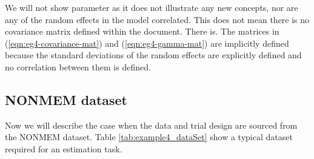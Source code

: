 We will not show parameter  as it does not illustrate any new
concepts, nor are any of the random effects in the model
correlated. This does not mean there is no covariance matrix defined
within the \pharmml document. There is. The matrices in
(\ref{eqn:eg4-covariance-mat}) and (\ref{eqn:eg4-gamma-mat}) are
implicitly defined because the standard deviations of the random effects 
are explicitly defined and no correlation between them is defined.


\subsection{NONMEM dataset}
\label{sec:eg4-NONMEMdataset}
Now we will describe the case when the data and trial design are sourced from the 
NONMEM dataset. Table \ref{tab:example4_dataSet} show a typical dataset required for 
an estimation task.
